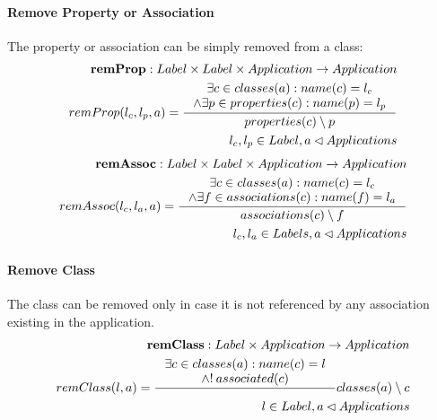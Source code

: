 \documentclass[11pt]{article}
\begin{document}
\paragraph{Remove Property or Association} The property or association can be simply removed from a class:
\begin{align*}
 	\mathbf{remProp} : Label \times Label \times Application \rightarrow Application \\
 	remProp(l_c, l_p, a) = \inference{\exists c \in classes(a) : name(c) = l_c \\ \wedge \exists p \in properties(c) : name(p) = l_p
	}{properties(c) \setminus p }\\
	l_c, l_p \in Label, a \lhd Applications 
\end{align*}
\begin{align*}
	\mathbf{remAssoc} : Label \times Label \times Application \rightarrow Application \\
	remAssoc(l_c, l_a, a) = \inference{\exists c \in classes(a) : name(c) = l_c \\ \wedge \exists f \in associations(c) : name(f) = l_a }{associations(c) \setminus f} \\
	l_c, l_a \in Labels, a \lhd Applications
\end{align*}

\paragraph{Remove Class} The class can be removed only in case it is not referenced by any association existing in the application.
\begin{align*}
	\mathbf{remClass} : Label \times Application \rightarrow Application \\
	remClass(l, a) = \inference{\exists c \in classes(a) : name(c) = l \\ \wedge !\: associated(c)
	} {classes(a) \setminus c }\\
	l \in Label,a \lhd Applications
\end{align*}
\end{document}
